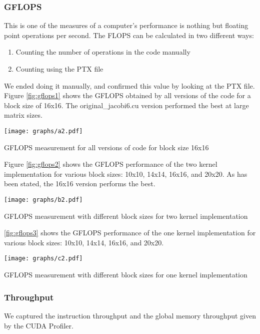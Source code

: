 \documentclass[10pt]{article}
\makeatletter
\newenvironment{figurehere}
{\def\@captype{figure}}
{}
\makeatother
\begin{document}
\begin{multicols}{2}
  \subsubsection{GFLOPS}
  This is one of the measures of a computer's performance is nothing but floating point operations per second.
  The FLOPS can be calculated in two different ways:
  \begin{enumerate}
    \item Counting the number of operations in the code manually
    \item Counting using the PTX file
  \end{enumerate}
  We ended doing it manually, and confirmed this value by looking at the PTX file.
  Figure \ref{fig:gflops1} shows the GFLOPS obtained by all versions of the code for a block size of 16x16.
  The original_jacobi6.cu version performed the best at large matrix sizes.

  \begin{figurehere}
    \centering
    \texttt{[image: graphs/a2.pdf]}
    \caption{GFLOPS measurement for all versions of code for block size 16x16}
    \label{fig:gflops1}
  \end{figurehere}

  Figure \ref{fig:gflops2} shows the GFLOPS performance of the two kernel implementation for various block sizes: 10x10, 14x14, 16x16, and 20x20.
  As has been stated, the 16x16 version performs the best.

  \begin{figurehere}
    \centering
    \texttt{[image: graphs/b2.pdf]}
    \caption{GFLOPS measurement with different block sizes for two kernel implementation}
    \label{fig:gflops2}
  \end{figurehere}

  \ref{fig:gflops3} shows the GFLOPS performance of the one kernel implementation for various block sizes: 10x10, 14x14, 16x16, and 20x20.

  \begin{figurehere}
    \centering
    \texttt{[image: graphs/c2.pdf]}
    \caption{GFLOPS measurement with different block sizes for one kernel implementation}
    \label{fig:gflops3}
  \end{figurehere}

  \subsubsection{Throughput}
  We captured the instruction throughput and the global memory throughput given by the CUDA Profiler.


\end{multicols}
\end{document}
